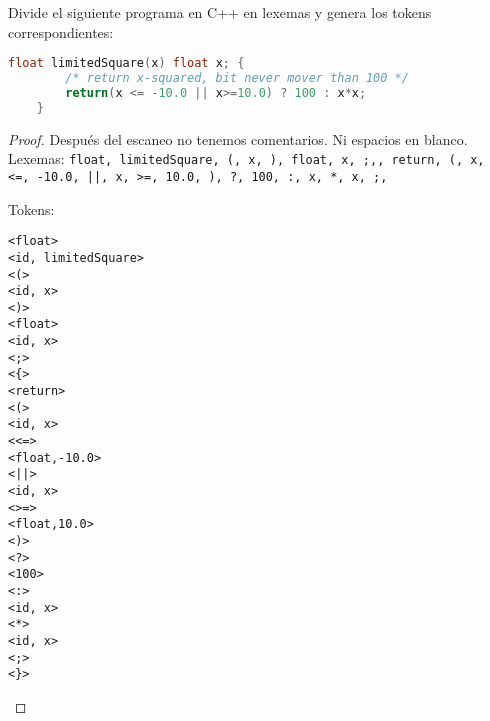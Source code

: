 \begin{Pro}
Divide el siguiente programa en C++ en lexemas y genera los tokens correspondientes:
\end{Pro}
\begin{lstlisting}[language=C++]
    float limitedSquare(x) float x; {
        /* return x-squared, bit never mover than 100 */
        return(x <= -10.0 || x>=10.0) ? 100 : x*x;
    }
\end{lstlisting}

\begin{proof}
    \hspace{5mm}

Después del escaneo no tenemos comentarios. Ni espacios en blanco. 
Lexemas: \texttt{float, limitedSquare, (, x, ), float, x, ;,{, return, (, x, <=, -10.0, ||, x, >=, 10.0, ), ?, 100, :, x, *, x, ;, }}

Tokens:
\begin{lstlisting}
<float>
<id, limitedSquare>
<(>
<id, x>
<)>
<float>
<id, x>
<;>
<{>
<return>
<(>
<id, x>
<<=>
<float,-10.0>
<||>
<id, x>
<>=>
<float,10.0>
<)>
<?>
<100>
<:>
<id, x>
<*>
<id, x>
<;>
<}>
\end{lstlisting}
\end{proof}
